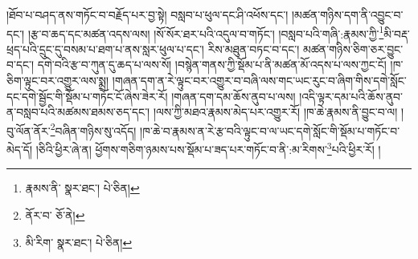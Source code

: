 །ཐོབ་པ་བཤད་ནས་གཏོང་བ་བརྗོད་པར་བྱ་སྟེ། བསླབ་པ་ཕུལ་དང་ཤི་འཕོས་དང་། །མཚན་གཉིས་དག་ནི་འབྱུང་བ་དང་། །རྩ་བ་ཆད་དང་མཚན་འདས་ལས། །སོ་སོར་ཐར་པའི་འདུལ་བ་གཏོང་། །བསླབ་པའི་གཞི་:རྣམས་ཀྱི་\footnote{རྣམས་ནི་  སྣར་ཐང་།  པེ་ཅིན། }མི་བརྡ་ཕྲད་པའི་དྲུང་དུ་བསམ་པ་ཐག་པ་ནས་སླར་ཕུལ་པ་དང་། རིས་མཐུན་བཏང་བ་དང་། མཚན་གཉིས་ཅིག་ཅར་བྱུང་བ་དང་། དགེ་བའི་རྩ་བ་ཀུན་དུ་ཆད་པ་ལས་སོ། །བསྙེན་གནས་ཀྱི་སྡོམ་པ་ནི་མཚན་མོ་འདས་པ་ལས་ཀྱང་ངོ། །ཁ་ཅིག་ལྟུང་བར་འགྱུར་ལས་སྨྲ། །གཞན་དག་ན་རེ་ལྟུང་བར་འགྱུར་བ་བཞི་ལས་གང་ཡང་རུང་བ་ཞིག་གིས་དགེ་སློང་དང་དགེ་སྦྱོང་གི་སྡོམ་པ་གཏོང་ངོ་ཞེས་ཟེར་རོ། །གཞན་དག་དམ་ཆོས་ནུབ་པ་ལས། །འདི་ལྟར་དམ་པའི་ཆོས་ནུབ་ན་བསླབ་པའི་མཚམས་ཐམས་ཅད་དང་། །ལས་ཀྱི་མཐའ་རྣམས་མེད་པར་འགྱུར་རོ། །ཁ་ཆེ་རྣམས་ནི་བྱུང་བ་ལ། །བུ་ལོན་ནོར་\footnote{ནོར་བ་  ཅོ་ནེ། }བཞིན་གཉིས་སུ་འདོད། །ཁ་ཆེ་བ་རྣམས་ན་རེ་རྩ་བའི་ལྟུང་བ་ལ་ཡང་དགེ་སློང་གི་སྡོམ་པ་གཏོང་བ་མེད་དོ། །ཅིའི་ཕྱིར་ཞེ་ན། ཕྱོགས་གཅིག་ཉམས་པས་སྡོམ་པ་ཟད་པར་གཏོང་བ་ནི་:མ་རིགས་\footnote{མི་རིག་  སྣར་ཐང་།  པེ་ཅིན། }པའི་ཕྱིར་རོ། །
